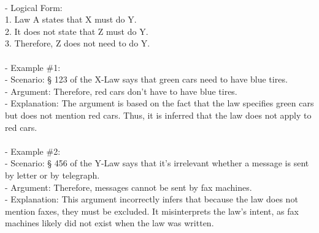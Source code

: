 \documentclass[a4paper,12pt,single,pdftex]{scrartcl}
\begin{document}
    
      
    \\

    
      - Logical Form:
    \\

    
        1. Law A states that X must do Y.
    \\

    
        2. It does not state that Z must do Y.
    \\

    
        3. Therefore, Z does not need to do Y.
    \\

    
      
    \\

    
      - Example \#1:
    \\

    
        - Scenario: § 123 of the X-Law says that green cars need to have blue tires.
    \\

    
        - Argument: Therefore, red cars don't have to have blue tires.
    \\

    
        - Explanation: The argument is based on the fact that the law specifies green cars but does not mention red cars. Thus, it is inferred that the law does not apply to red cars.
    \\

    
      
    \\

    
      - Example \#2:
    \\

    
        - Scenario: § 456 of the Y-Law says that it's irrelevant whether a message is sent by letter or by telegraph.
    \\

    
        - Argument: Therefore, messages cannot be sent by fax machines.
    \\

    
        - Explanation: This argument incorrectly infers that because the law does not mention faxes, they must be excluded. It misinterprets the law's intent, as fax machines likely did not exist when the law was written.
    \\

    
      
    \\
\end{document}
